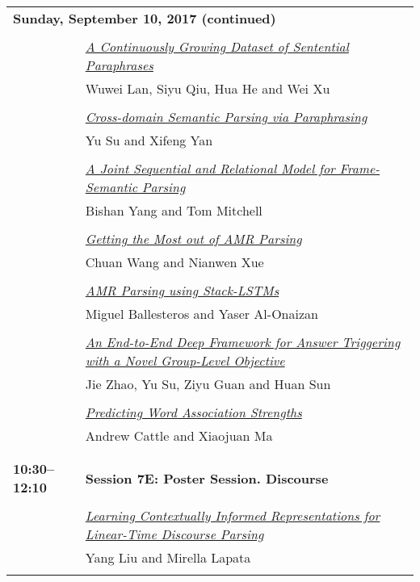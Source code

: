 \begin{tabular}{p{20mm}p{128mm}}
\\
\multicolumn{2}{l}{\bf Sunday, September 10, 2017 (continued)} \\\\
 & \hyperlink{page.1233}{\em A Continuously Growing Dataset of Sentential Paraphrases}\\
         & Wuwei Lan, Siyu Qiu, Hua He and Wei Xu \\
\\

 & \hyperlink{page.1244}{\em Cross-domain Semantic Parsing via Paraphrasing}\\
         & Yu Su and Xifeng Yan \\
\\

 & \hyperlink{page.1256}{\em A Joint Sequential and Relational Model for Frame-Semantic Parsing}\\
         & Bishan Yang and Tom Mitchell \\
\\

 & \hyperlink{page.1266}{\em Getting the Most out of AMR Parsing}\\
         & Chuan Wang and Nianwen Xue \\
\\

 & \hyperlink{page.1278}{\em AMR Parsing using Stack-LSTMs}\\
         & Miguel Ballesteros and Yaser Al-Onaizan \\
\\

 & \hyperlink{page.1285}{\em An End-to-End Deep Framework for Answer Triggering with a Novel Group-Level Objective}\\
         & Jie Zhao, Yu Su, Ziyu Guan and Huan Sun \\
\\

 & \hyperlink{page.1292}{\em Predicting Word Association Strengths}\\
         & Andrew Cattle and Xiaojuan Ma \\
\\

\\{\bf 10:30--12:10} & {\bf Session 7E: Poster Session. Discourse } \\
\\
 & \hyperlink{page.1298}{\em Learning Contextually Informed Representations for Linear-Time Discourse Parsing}\\
         & Yang Liu and Mirella Lapata \\
\\


\end{tabular}
